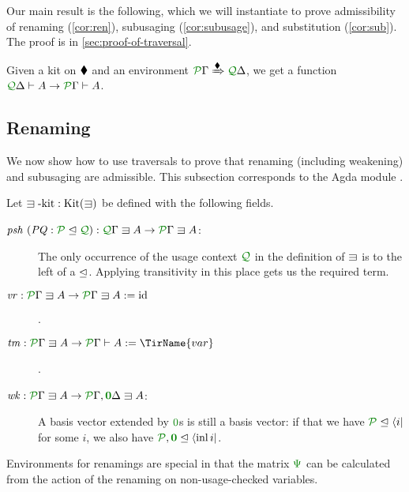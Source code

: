 \documentclass[submission,copyright,creativecommons]{eptcs}
\begin{document}
Our main result is the following, which we will instantiate to prove
admissibility of renaming (\autoref{cor:ren}), subusaging
(\autoref{cor:subusage}), and substitution (\autoref{cor:sub}). The
proof is in \autoref{sec:proof-of-traversal}.

\newcommand{\thmtrav}{%
  Given a kit on $\kitrel$ and an environment
  $\ctx{\Gamma}{P} \subst{\kitrel} \ctx{\Delta}{Q}$, we get a function
  $\ctx{\Delta}{Q} \vdash A \to \ctx{\Gamma}{P} \vdash A$.%
}
\begin{theorem}\label{thm:trav}
  \thmtrav
\end{theorem}

\subsection{Renaming}

We now show how to use traversals to prove that renaming (including
weakening) and subusaging are admissible. This subsection corresponds
to the Agda module .

\begin{definition}\label{def:lvar-kit}
  Let $\lvar\textrm{-kit} : \kit(\lvar)$ be defined with the following
  fields.
  \begin{description}
    \item[$\mathit{psh}~(\mathit{PQ} : \resctx P \subres \resctx Q)
      : \ctx{\Gamma}{Q} \lvar A \to \ctx{\Gamma}{P} \lvar A$:]
      The only occurrence of the usage context $\resctx Q$ in the definition of
      $\lvar$ is to the left of a $\trianglelefteq$.
      Applying transitivity in this place gets us the required term.
    \item[$\mathit{vr} : \ctx{\Gamma}{P} \lvar A \to \ctx{\Gamma}{P} \lvar A
      := \mathrm{id}$].
    \item[$\mathit{tm} : \ctx{\Gamma}{P} \lvar A \to \ctx{\Gamma}{P} \vdash A
      := \TirName{var}$].
    \item[$\mathit{wk} : \ctx{\Gamma}{P} \lvar A
      \to \ctx{\Gamma}{P}, \ctx{\Delta}{\vct 0} \lvar A$:]
      A basis vector extended by $\rescomment 0$s is still a basis
      vector: if that we have $\resctx P \subres \langle i \rvert$ for some $i$,
      we also have
      $\resctx P, \rescomment{\vct 0} \subres \langle \inl i \rvert$.
  \end{description}
\end{definition}

Environments for renamings are special in that the matrix $\rescomment\Psi$ can
be calculated from the action of the renaming on non-usage-checked variables.
\end{document}
